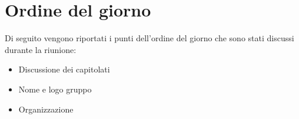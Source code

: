 \clearpage
\section{Ordine del giorno}
Di seguito vengono riportati i punti dell’ordine del giorno che sono stati discussi durante la riunione:
\begin{itemize}
	\item Discussione dei capitolati 
	\item Nome e logo gruppo
	\item Organizzazione
\end{itemize}
